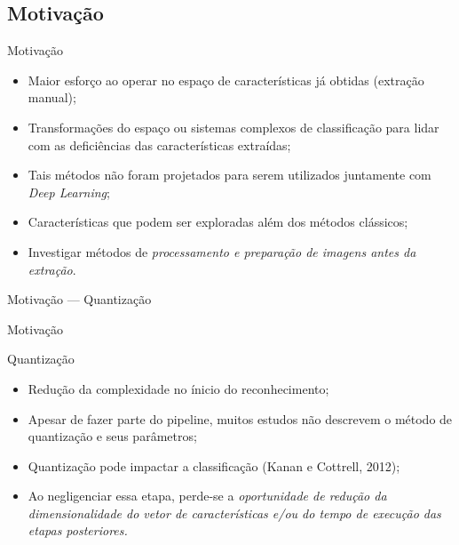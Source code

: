 \documentclass{beamer}
\begin{document}
\subsection{Motivação}
\begin{frame}{Motivação}
  \setlength\leftmargini{1em}
  \justifying
  \begin{itemize}
    \item Maior esforço ao operar no espaço de características já obtidas (extração manual);
    \item Transformações do espaço ou sistemas complexos de classificação para lidar com as deficiências das características extraídas;
    \item Tais métodos não foram projetados para serem utilizados juntamente com \textit{Deep Learning};
    \item Características que podem ser exploradas além dos métodos clássicos;
    \item Investigar métodos de \textit{processamento e preparação de imagens antes da extração}.
  \end{itemize}
\end{frame}
\begin{frame}{Motivação --- Quantização}
  \setlength\leftmargini{1em}
  \justifying
\end{frame}
\begin{frame}{Motivação}
  \setlength\leftmargini{1em}
  \begin{block}{Quantização}
  \justifying
  \begin{itemize}
    \justifying
    \item Redução da complexidade no ínicio do reconhecimento;
    \item Apesar de fazer parte do pipeline, muitos estudos não descrevem o método de quantização e seus parâmetros;
    \item Quantização pode impactar a classificação (Kanan e Cottrell, 2012);
    \item Ao negligenciar essa etapa, perde-se a \textit{oportunidade de redução da dimensionalidade do vetor de características e/ou do tempo de execução das etapas posteriores.}
  \end{itemize}
  \end{block}
\end{frame}
\end{document}
